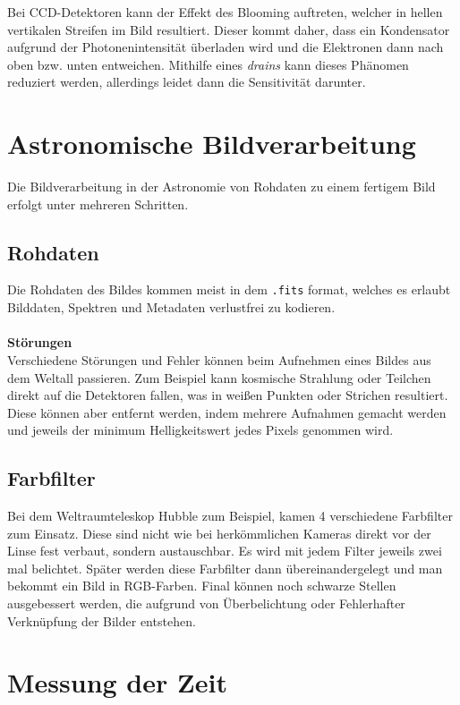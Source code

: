 \documentclass[a4paper,12pt]{article}
\begin{document}
Bei CCD-Detektoren kann der Effekt des Blooming auftreten, welcher in hellen vertikalen Streifen im Bild resultiert. Dieser kommt daher, dass ein Kondensator aufgrund der Photonenintensität überladen wird und die Elektronen dann nach oben bzw. unten entweichen. Mithilfe eines \textit{drains} kann dieses Phänomen reduziert werden, allerdings leidet dann die Sensitivität darunter.

\section{Astronomische Bildverarbeitung}
Die Bildverarbeitung in der Astronomie von Rohdaten zu einem fertigem Bild erfolgt unter mehreren Schritten. 

\subsection{Rohdaten}
Die Rohdaten des Bildes kommen meist in dem \texttt{.fits} format, welches es erlaubt Bilddaten, Spektren und Metadaten verlustfrei zu kodieren. 
\\\hfill\\\textbf{Störungen}\\ 
Verschiedene Störungen und Fehler können beim Aufnehmen eines Bildes aus dem Weltall passieren. Zum Beispiel kann kosmische Strahlung oder Teilchen direkt auf die Detektoren fallen, was in weißen Punkten oder Strichen resultiert. Diese können aber entfernt werden, indem mehrere Aufnahmen gemacht werden und jeweils der minimum Helligkeitswert jedes Pixels genommen wird.

\subsection{Farbfilter}
Bei dem Weltraumteleskop Hubble zum Beispiel, kamen 4 verschiedene Farbfilter zum Einsatz. Diese sind nicht wie bei herkömmlichen Kameras direkt vor der Linse fest verbaut, sondern austauschbar. Es wird mit jedem Filter jeweils zwei mal belichtet. Später werden diese Farbfilter dann übereinandergelegt und man bekommt ein Bild in RGB-Farben. Final können noch schwarze Stellen ausgebessert werden, die aufgrund von Überbelichtung oder Fehlerhafter Verknüpfung der Bilder entstehen.

\section{Messung der Zeit}
\end{document}
